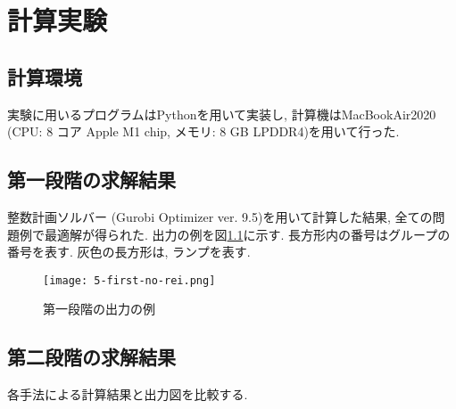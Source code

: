 \chapter{計算実験}\label{computational_result}
\section{計算環境}
実験に用いるプログラムはPythonを用いて実装し, 計算機はMacBookAir2020 (CPU: 8 コア Apple M1 chip, メモリ: 8 GB LPDDR4)を用いて行った. 

\section{第一段階の求解結果}
整数計画ソルバー (Gurobi Optimizer ver. 9.5)を用いて計算した結果, 全ての問題例で最適解が得られた. 
出力の例を図\ref{first-no-rei}に示す. 
長方形内の番号はグループの番号を表す. 
灰色の長方形は, ランプを表す. \\

\begin{figure}[b]
    \texttt{[image: 5-first-no-rei.png]}
    \caption{第一段階の出力の例}
    \label{first-no-rei}
\end{figure}
\clearpage


\section{第二段階の求解結果}
各手法による計算結果と出力図を比較する. 


